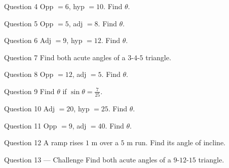 \documentclass[11pt]{article}
\begin{document}
\begin{qbox}{Question 4}
Opp $=6$, hyp $=10$. Find $\theta$.\workspace{2.0cm}
\end{qbox}

\begin{qbox}{Question 5}
Opp $=5$, adj $=8$. Find $\theta$.\workspace{2.0cm}
\end{qbox}

\begin{qbox}{Question 6}
Adj $=9$, hyp $=12$. Find $\theta$.\workspace{2.0cm}
\end{qbox}

\begin{qbox}{Question 7}
Find both acute angles of a $3$-$4$-$5$ triangle.\workspace{2.4cm}
\end{qbox}

\begin{qbox}{Question 8}
Opp $=12$, adj $=5$. Find $\theta$.\workspace{2.0cm}
\end{qbox}

\begin{qbox}{Question 9}
Find $\theta$ if $\sin\theta=\tfrac{7}{25}$.\workspace{2.0cm}
\end{qbox}

\begin{qbox}{Question 10}
Adj $=20$, hyp $=25$. Find $\theta$.\workspace{2.0cm}
\end{qbox}

\begin{qbox}{Question 11}
Opp $=9$, adj $=40$. Find $\theta$.\workspace{2.0cm}
\end{qbox}

\begin{qbox}{Question 12}
A ramp rises $1$ m over a $5$ m run. Find its angle of incline.\workspace{2.2cm}
\end{qbox}

\begin{qbox}{Question 13 --- Challenge}
Find both acute angles of a $9$-$12$-$15$ triangle.\workspace{2.6cm}
\end{qbox}

\clearpage
{}
\end{document}
